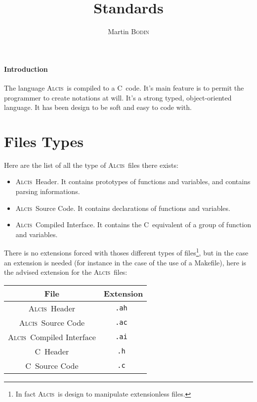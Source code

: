 \documentclass{article}
\title{\Alcis Standards}
\author{Martin \textsc{Bodin}}
\date{}
\newcommand{\Alcis}{\textsc{Alcis}~}
\renewcommand{\C}{\textsc{C}~}
\begin{document}
\maketitle

\newpage

\tableofcontents

\newpage

\paragraph{Introduction}
{
    The language \Alcis is compiled to a \C code.
    It’s main feature is to permit the programmer to create notations at will.
    It’s a strong typed, object-oriented language.
    It has been design to be soft and easy to code with.
}

\section{Files Types}

Here are the list of all the type of \Alcis files there exists:
\begin{itemize}
    \item \Alcis Header. It contains prototypes of functions and variables, and contains parsing informations.
    \item \Alcis Source Code. It contains declarations of functions and variables.
    \item \Alcis Compiled Interface. It contains the \C equivalent of a group of function and variables.
\end{itemize}

There is no extensions forced with thoses different types of files\footnote
{
    In fact \Alcis is design to manipulate extensionless files.
}, but in the case an extension is needed (for instance in the case of the use of a Makefile), here is the advised extension for the \Alcis files:

\begin{center}\begin{tabular}{|c||c|}
\hline File & Extension \\
\hline \Alcis Header & \tt .ah \\
\hline \Alcis Source Code & \tt .ac \\
\hline \Alcis Compiled Interface & \tt .ai \\
\hline \C Header & \tt .h \\
\hline \C Source Code & \tt .c \\
\hline
\end{tabular}\end{center}
\end{document}
